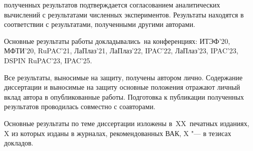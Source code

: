 {\reliability} полученных результатов подтверждается согласованием аналитических вычислений с результатами численных экспериментов. Результаты находятся в соответствии с результатами, полученными другими авторами.

{\probation}
Основные результаты работы докладывались~на конференциях: ИТЭФ’20, МФТИ’20, RuPAC'21, ЛаПлаз'21, ЛаПлаз'22, IPAC'22, ЛаПлаз'23, IPAC'23, DSPIN RuPAC'23, IPAC'25.

{\contribution}  Все результаты, выносимые на защиту, получены автором лично. Содержание диссертации и выносимые на защиту основные положения отражают личный вклад автора в опубликованные работы. Подготовка к публикации полученных результатов проводилась совместно с соавторами.

{%
    {\publications} Основные результаты по теме диссертации изложены
    в~XX~печатных изданиях,
    X из которых изданы в журналах, рекомендованных ВАК,
    X "--- в тезисах докладов.
}%
